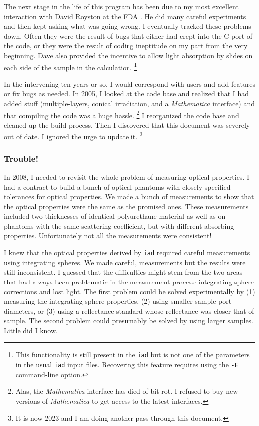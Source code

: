 \documentclass{article}
\newcommand\iadprog{\texttt{iad}}
\begin{document}
The next stage in the life of this program has been due to my most excellent
interaction with David Royston at the FDA \cite{royston96}.  He did many careful experiments and
then kept asking what was going wrong.  I eventually tracked these
problems down.  Often they were the result of bugs that either had crept into the
C port of the code, or they were the result of coding ineptitude on my part
from the very beginning.  Dave also provided the incentive to allow
light absorption by slides on each side of the sample in the calculation.%
\footnote{This functionality is still present in the \iadprog{} but
is not one of the parameters in the usual \iadprog{} input files.  Recovering
this feature requires using the \texttt{-E} command-line option.}

In the intervening ten years or so, I would correspond with users and add
features or fix bugs as needed.  In 2005, I looked at the code base and realized that I had added
stuff (multiple-layers, conical irradiation, and a \textit{Mathematica} interface) and that 
compiling the code was a huge hassle.%
\footnote{Alas, the \textit{Mathematica} interface has died of bit rot.  I refused to buy new 
versions of \textit{Mathematica} to get access to the latest interfaces.} 
I reorganized the code
base and cleaned up the build process.  Then I discovered that this document was
severely out of date.  I ignored the urge to update it.%
\footnote{It is now 2023 and I am
doing another pass through this document.}

\subsubsection*{Trouble!}

In 2008, I needed to revisit the whole problem of measuring optical
properties.  I had a contract to build a bunch of optical phantoms with closely
specified tolerances for optical properties.  We made a bunch of measurements
to show that the optical properties were the same as the promised ones.  These measurements 
included two thicknesses of identical polyurethane material as well as on phantoms with the
same scattering coefficient, but with different absorbing properties.  Unfortunately
not all the measurements were consistent!

I knew that the optical properties derived by \iadprog{} required careful measurements
using integrating spheres.  We made careful, measurements but the results were still
inconsistent.  I guessed that the difficulties might stem from the two areas that had
always been problematic 
in the measurement process: integrating sphere corrections and lost light.
The first problem could be solved experimentally by (1) measuring the integrating
sphere properties, (2) using smaller sample port diameters, or (3) using a reflectance 
standard whose reflectance was 
closer that of sample.  The second problem could presumably be solved
by using larger samples.  Little did I know.
\end{document}

